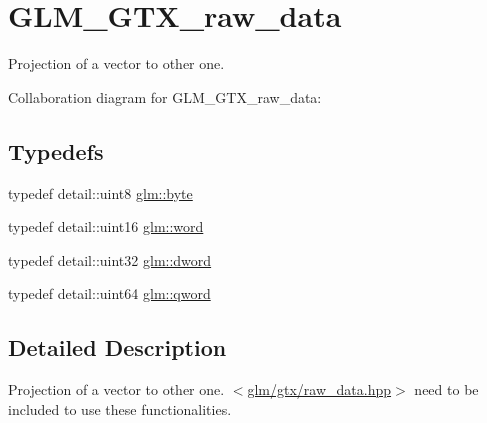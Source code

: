 \hypertarget{group__gtx__raw__data}{\section{G\-L\-M\-\_\-\-G\-T\-X\-\_\-raw\-\_\-data}
\label{group__gtx__raw__data}
}


Projection of a vector to other one.  


Collaboration diagram for G\-L\-M\-\_\-\-G\-T\-X\-\_\-raw\-\_\-data\-:
\subsection*{Typedefs}
\begin{DoxyCompactItemize}
\item 
typedef detail\-::uint8 \hyperlink{group__gtx__raw__data_gacd7fe1f2ad60a57f7d7ad4f1e6836efd}{glm\-::byte}
\item 
typedef detail\-::uint16 \hyperlink{group__gtx__raw__data_ga5617a479d471021b5c773c5e969ba46d}{glm\-::word}
\item 
typedef detail\-::uint32 \hyperlink{group__gtx__raw__data_ga1fc2589df6d44e923cd1820cf14805cf}{glm\-::dword}
\item 
typedef detail\-::uint64 \hyperlink{group__gtx__raw__data_ga32447af289e879589883c9b7e3be1246}{glm\-::qword}
\end{DoxyCompactItemize}


\subsection{Detailed Description}
Projection of a vector to other one. $<$\hyperlink{raw__data_8hpp}{glm/gtx/raw\-\_\-data.\-hpp}$>$ need to be included to use these functionalities. 

